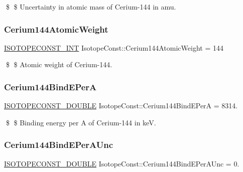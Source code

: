 \$ \$ Uncertainty in atomic mass of Cerium-\/144 in amu. \mbox{\label{group___isotope_const-_cerium-_ce144_ga6a5dea2a40fff5707820eead37204176}} 
\subsubsection{\texorpdfstring{Cerium144\+Atomic\+Weight}{Cerium144AtomicWeight}}
{\footnotesize\ttfamily \mbox{\hyperlink{group___isotope_const-_macros_ga5f18360b3e99483a35c32d789e62621c}{I\+S\+O\+T\+O\+P\+E\+C\+O\+N\+S\+T\+\_\+\+I\+NT}} Isotope\+Const\+::\+Cerium144\+Atomic\+Weight = 144}

\$ \$ Atomic weight of Cerium-\/144. \mbox{\label{group___isotope_const-_cerium-_ce144_ga93c3146d0b515a29d34aeea4daa9e00a}} 
\subsubsection{\texorpdfstring{Cerium144\+Bind\+E\+PerA}{Cerium144BindEPerA}}
{\footnotesize\ttfamily \mbox{\hyperlink{group___isotope_const-_macros_ga8f45a7272ce02c0b4c65c44636ed719a}{I\+S\+O\+T\+O\+P\+E\+C\+O\+N\+S\+T\+\_\+\+D\+O\+U\+B\+LE}} Isotope\+Const\+::\+Cerium144\+Bind\+E\+PerA = 8314.}

\$ \$ Binding energy per A of Cerium-\/144 in keV. \mbox{\label{group___isotope_const-_cerium-_ce144_ga9a4304b011c10706505d54935fe49674}} 
\subsubsection{\texorpdfstring{Cerium144\+Bind\+E\+Per\+A\+Unc}{Cerium144BindEPerAUnc}}
{\footnotesize\ttfamily \mbox{\hyperlink{group___isotope_const-_macros_ga8f45a7272ce02c0b4c65c44636ed719a}{I\+S\+O\+T\+O\+P\+E\+C\+O\+N\+S\+T\+\_\+\+D\+O\+U\+B\+LE}} Isotope\+Const\+::\+Cerium144\+Bind\+E\+Per\+A\+Unc = 0.}

